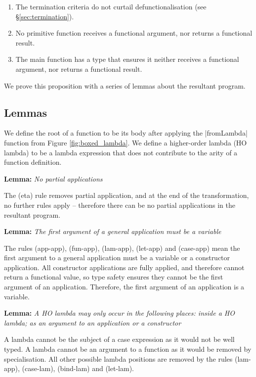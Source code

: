 \documentclass[preprint]{sigplanconf}
\newenvironment{lemma}[1]
    {\smallskip
     \noindent\textbf{Lemma:} \textit{#1}}
    {\noexample}
\begin{document}
\begin{enumerate}
\item The termination criteria do not curtail defunctionalisation (see \S\ref{sec:termination}).
\item No primitive function receives a functional argument, nor returns a functional result.
\item The main function has a type that ensures it neither receives a functional argument, nor returns a functional result.
\end{enumerate}

We prove this proposition with a series of lemmas about the resultant program.

\subsection{Lemmas}

We define the root of a function to be its body after applying the |fromLambda| function from Figure \ref{fig:boxed_lambda}. We define a higher-order lambda (HO lambda) to be a lambda expression that does not contribute to the arity of a function definition.

\begin{lemma}{No partial applications}

The (eta) rule removes partial application, and at the end of the transformation, no further rules apply -- therefore there can be no partial applications in the resultant program.
\end{lemma}

\begin{lemma}{The first argument of a general application must be a variable}

The rules (app-app), (fun-app), (lam-app), (let-app) and (case-app) mean the first argument to a general application must be a variable or a constructor application. All constructor applications are fully applied, and therefore cannot return a functional value, so type safety ensures they cannot be the first argument of an application. Therefore, the first argument of an application is a variable.
\end{lemma}

\begin{lemma}{A HO lambda may only occur in the following places: inside a HO lambda; as an argument to an application or a constructor}

A lambda cannot be the subject of a case expression as it would not be well typed. A lambda cannot be an argument to a function as it would be removed by specialisation. All other possible lambda positions are removed by the rules (lam-app), (case-lam), (bind-lam) and (let-lam).
\end{lemma}
\end{document}
